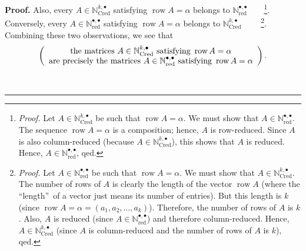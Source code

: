 \documentclass
[numbers=enddot,12pt,final,onecolumn,notitlepage,abstracton]{scrartcl}%
\theoremstyle{definition}
\newenvironment{proof}[1][Proof]{\noindent\textbf{#1.} }{\ \rule{0.5em}{0.5em}}
\begin{document}
\begin{proof}
Also, every $A\in\mathbb{N}_{\operatorname*{Cred}}^{k,\bullet}$ satisfying
$\operatorname*{row}A=\alpha$ belongs to $\mathbb{N}_{\operatorname*{red}%
}^{\bullet,\bullet}$\ \ \ \ \footnote{\textit{Proof.} Let $A\in\mathbb{N}%
_{\operatorname*{Cred}}^{k,\bullet}$ be such that $\operatorname*{row}%
A=\alpha$. We must show that $A\in\mathbb{N}_{\operatorname*{red}}%
^{\bullet,\bullet}$. The sequence $\operatorname*{row}A=\alpha$ is a
composition; hence, $A$ is row-reduced. Since $A$ is also column-reduced
(because $A\in\mathbb{N}_{\operatorname*{Cred}}^{k,\bullet}$), this shows that
$A$ is reduced. Hence, $A\in\mathbb{N}_{\operatorname*{red}}^{\bullet,\bullet
}$, qed.}. Conversely, every $A\in\mathbb{N}_{\operatorname*{red}}%
^{\bullet,\bullet}$ satisfying $\operatorname*{row}A=\alpha$ belongs to
$\mathbb{N}_{\operatorname*{Cred}}^{k,\bullet}$%
\ \ \ \ \footnote{\textit{Proof.} Let $A\in\mathbb{N}_{\operatorname*{red}%
}^{\bullet,\bullet}$ be such that $\operatorname*{row}A=\alpha$. We must show
that $A\in\mathbb{N}_{\operatorname*{Cred}}^{k,\bullet}$. The number of rows
of $A$ is clearly the length of the vector $\operatorname*{row}A$ (where the
\textquotedblleft length\textquotedblright\ of a vector just means its number
of entries). But this length is $k$ (since $\operatorname*{row}A=\alpha
=\left(  a_{1},a_{2},\ldots,a_{k}\right)  $). Therefore, the number of rows of
$A$ is $k$. Also, $A$ is reduced (since $A\in\mathbb{N}_{\operatorname*{red}%
}^{\bullet,\bullet}$) and therefore column-reduced. Hence, $A\in
\mathbb{N}_{\operatorname*{Cred}}^{k,\bullet}$ (since $A$ is column-reduced
and the number of rows of $A$ is $k$), qed.}. Combining these two
observations, we see that
\begin{equation}
\left(
\begin{array}
[c]{c}%
\text{the matrices }A\in\mathbb{N}_{\operatorname*{Cred}}^{k,\bullet}\text{
satisfying }\operatorname*{row}A=\alpha\\
\text{are precisely the matrices }A\in\mathbb{N}_{\operatorname*{red}%
}^{\bullet,\bullet}\text{ satisfying }\operatorname*{row}A=\alpha
\end{array}
\right)  . \label{pf.prop.QSym.secondcomult.alt.helper5}%
\end{equation}



\end{proof}
\end{document}
